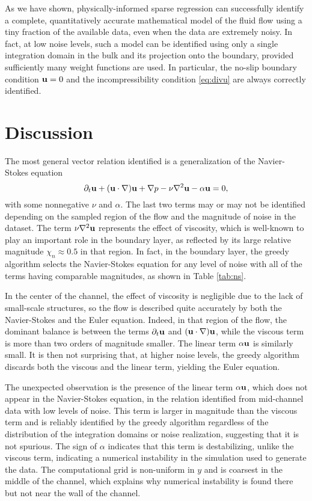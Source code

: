 \documentclass[
 reprint,
 amsmath,amssymb,
 aps,
]{revtex4-2}
\begin{document}
As we have shown, physically-informed sparse regression can successfully identify a complete, quantitatively accurate mathematical model of the fluid flow using a tiny fraction of the available data, even when the data are extremely noisy. In fact, at low noise levels, such a model can be identified using only a single integration domain in the bulk and its projection onto the boundary, provided sufficiently many weight functions are used. In particular, the no-slip boundary condition ${\bf u}=0$ and the incompressibility condition \eqref{eq:divu} are always correctly identified. 

\section*{Discussion}

The most general vector relation identified is a generalization of the Navier-Stokes equation
\begin{equation} \label{eq:unstable}
    \partial_t{\bf u}+({\bf u}\cdot\nabla){\bf u}+\nabla p-\nu\nabla^2{\bf u}-\alpha{\bf u}=0,
\end{equation}
with some nonnegative $\nu$ and $\alpha$. The last two terms may or may not be identified depending on the sampled region of the flow and the magnitude of noise in the dataset. The term $\nu\nabla^2{\bf u}$ represents the effect of viscosity, which is well-known to play an important role in the boundary layer, as reflected by its large relative magnitude ${\chi_n\approx 0.5}$ in that region. In fact, in the boundary layer, the greedy algorithm selects the Navier-Stokes equation for any level of noise with all of the terms having comparable magnitudes, as shown in Table \ref{tab:ns}. 

In the center of the channel, the effect of viscosity is negligible due to the lack of small-scale structures, so the flow is described quite accurately by both the Navier-Stokes and the Euler equation. Indeed, in that region of the flow, the dominant balance is between the terms $\partial_t{\bf u}$ and $({\bf u}\cdot\nabla){\bf u}$, while the viscous term is more than two orders of magnitude smaller. The linear term $\alpha{\bf u}$ is similarly small. It is then not surprising that, at higher noise levels, the greedy algorithm discards both the viscous and the linear term, yielding the Euler equation.

The unexpected observation is the presence of the linear term $\alpha{\bf u}$, which does not appear in the Navier-Stokes equation, in the relation identified from mid-channel data with low levels of noise. This term is larger in magnitude than the viscous term and is reliably identified by the greedy algorithm regardless of the distribution of the integration domains or noise realization, suggesting that it is not spurious. The sign of $\alpha$ indicates that this term is destabilizing, unlike the viscous term, indicating a numerical instability in the simulation used to generate the data. The computational grid is non-uniform in $y$ and is coarsest in the middle of the channel, which explains why numerical instability is found there but not near the wall of the channel.
\end{document}
